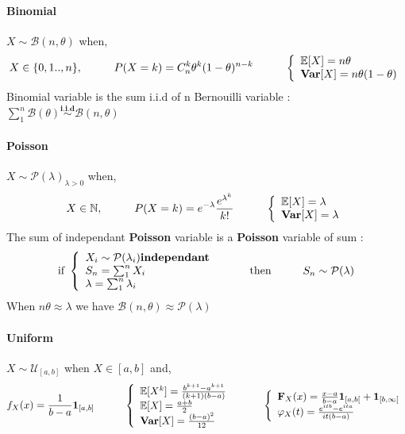 \documentclass[a4paper,10pt]{article}
\begin{document}
\paragraph{Binomial} $X\sim \mathcal{B}(n,\theta)$ when,
\[
X \in \{0,1 .. , n\} , 
\hspace{10mm}
P(X=k)=C^k_n\theta ^k (1-\theta)^{n-k} 
\hspace{10mm}
\left\{
\begin{array}{l}
\mathbb{E}[X]=n\theta \\
\textbf{Var}[X]=n \theta (1-\theta) 
\end{array}\right.
\]
Binomial variable is the sum i.i.d of n Bernouilli variable : $\sum_1^n \mathcal{B}(\theta) \stackrel{\textbf{i.i.d}}{\sim}  \mathcal{B}(n,\theta) $

\paragraph{Poisson} $X\sim \mathcal{P}(\lambda)_{\lambda>0}$ when,
\[
X \in \mathbb{N} , 
\hspace{10mm}
P(X=k)= e^{-\lambda}\frac{e^{\lambda^k}}{k!}
\hspace{10mm}
\left\{
\begin{array}{l}
\mathbb{E}[X]=\lambda \\
\textbf{Var}[X]=\lambda
\end{array}\right.
\]
The sum of independant \textbf{Poisson} variable is a \textbf{Poisson} variable of sum :
\[
\text{if  } 
\left\{
\begin{array}{l}
X_i \sim \mathcal{P}(\lambda_i) \textbf{independant} \\
S_n = \sum_{1}^{n} X_i \\
\lambda = \sum_{1}^{n} \lambda_i
\end{array}\right.
\hspace{10mm} \text{then} \hspace{10mm}
S_n \sim \mathcal{P}(\lambda)
\]
When $n\theta \approx \lambda$ we have $\mathcal{B}(n,\theta) \approx \mathcal{P}(\lambda)$

\paragraph{Uniform} $X\sim \mathcal{U}_{[a,b]}$ when $X \in [a,b]$ and,
\[
f_{X}(x) = \frac{1}{b-a}\mathbf{1}_{[a,b]}
\hspace{10mm}
\left\{
\begin{array}{l}
\mathbb{E}[X^k]=\frac{b^{k+1}-a^{k+1}}{(k+1)(b-a)} \\
\mathbb{E}[X]=\frac{a+b}{2} \\
\textbf{Var}[X]=\frac{(b-a)^2}{12} 
\end{array}\right.
\hspace{10mm}
\left\{
\begin{array}{l}
\textbf{F}_X(x) = \frac{x-a}{b-a}\mathbf{1}_{[a,b[} + \mathbf{1}_{[b,\infty[} \\
\varphi_{X}(t) = \frac{e^{itb}-e^{ita}}{it(b-a)}
\end{array}\right.
\]
\end{document}
